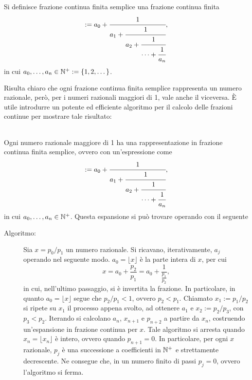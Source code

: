 \begin{defn}
 Si definisce {\upshape frazione continua finita semplice} una frazione continua finita 
 \begin{equation}
  [a_0;a_1,a_2,\dots,a_n] := 
  a_0 + \cfrac{1}{a_1 
      + \cfrac{1}{a_2 
      + \cfrac{1}{\dots + \cfrac{1}{a_n} } } },
 \end{equation}
 in cui $a_0, \dots, a_n \in \mathbb{N}^+ := \left\{1, 2, \dots \right\}$.
\end{defn}
Risulta chiaro che ogni frazione continua finita semplice rappresenta un numero razionale, però, per i numeri razionali maggiori di 1, vale anche il viceversa. È utile introdurre un potente ed efficiente algoritmo per il calcolo delle frazioni continue per mostrare tale risultato:
\begin{algo}\ \\
 Ogni numero razionale maggiore di 1 ha una rappresentazione in frazione continua finita semplice, ovvero con un'espressione come
 \begin{equation}
  [a_0;a_1,a_2,\dots,a_n] := 
  a_0 + \cfrac{1}{a_1 
      + \cfrac{1}{a_2 
      + \cfrac{1}{\dots + \cfrac{1}{a_n} } } },
 \end{equation}
 in cui $a_0, \dots, a_n \in \mathbb{N}^+$.
 Questa espansione si può trovare operando con il seguente
 \begin{description}
  \item[Algoritmo:] Sia $x = p_0/p_1$ un numero razionale. Si ricavano, iterativamente, $a_j$ operando nel seguente modo. $a_0 = \lfloor x \rfloor$ è la parte intera di $x$, per cui 
  \begin{equation}
   x = a_0 + \frac{p_2}{p_1} = a_0 +\frac{1}{\frac{p_1}{p_2}},
  \end{equation}
  in cui, nell'ultimo passaggio, si è invertita la frazione. In particolare, in quanto $a_0 = \lfloor x \rfloor$ segue che $p_2/p_1 < 1$, ovvero $p_2 < p_1$.
  Chiamato $x_1 := p_1/p_2$ si ripete su $x_1$ il processo appena svolto, ad ottenere $a_1$ e $x_2 := p_2/p_3$, con $p_3 < p_2$.
  Iterando si calcolano $a_n$, $x_{n+1}$ e $p_{n+2}$ a partire da $x_n$, costruendo un'espansione in frazione continua per $x$.
  Tale algoritmo si arresta quando $x_n = \lfloor x_n \rfloor$ è intero, ovvero quando $p_{n+1} = 0$.
  In particolare, per ogni $x$ razionale, $p_j$ è una successione a coefficienti in $\mathbb{N}^+$ e strettamente decrescente. Ne consegue che, in un numero finito di passi $p_j = 0$, ovvero l'algoritmo si ferma.
 \end{description}
\end{algo}
